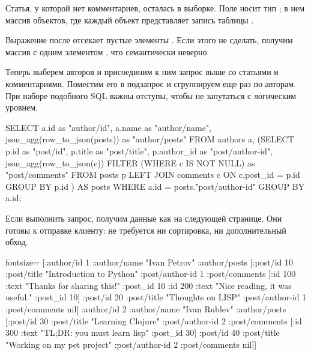 Статья, у которой нет комментариев, осталась в выборке. Поле  носит тип ; в нем массив объектов, где каждый объект представляет запись таблицы .

Выражение  после  отсекает пустые элементы . Если этого не сделать, получим массив с одним элементом , что семантически неверно.

Теперь выберем авторов и присоединим к ним запрос выше со статьями и комментариями. Поместим его в подзапрос и сгруппируем еще раз по авторам. При наборе подобного SQL важны отступы, чтобы не запутаться с логическим уровнем.

\begin{english}
  \begin{sql}
SELECT
  a.id                         as "author/id",
  a.name                       as "author/name",
  json_agg(row_to_json(posts)) as "author/posts"
FROM
  authors a,
  (SELECT
    p.id        as "post/id",
    p.title     as "post/title",
    p.author_id as "post/author-id",
    json_agg(row_to_json(c)) FILTER
            (WHERE c IS NOT NULL) as "post/comments"
  FROM posts p
  LEFT JOIN comments c ON c.post_id = p.id
  GROUP BY p.id
) AS posts
WHERE a.id = posts."post/author-id"
GROUP BY a.id;
  \end{sql}
\end{english}

Если выполнить запрос, получим данные как на следующей странице. Они готовы к отправке клиенту: не требуется ни сортировка, ни дополнительный обход.

\begin{english}
  \begin{clojure*}{fontsize=\small}
[{:author/id 1
  :author/name "Ivan Petrov"
  :author/posts
    [{:post/id 10
      :post/title "Introduction to Python"
      :post/author-id 1
      :post/comments
        [{:id 100
          :text "Thanks for sharing this!"
          :post_id 10}
         {:id 200
          :text "Nice reading, it was useful."
          :post_id 10}]}
     {:post/id 20
      :post/title "Thoughts on LISP"
      :post/author-id 1
      :post/comments nil}]}
 {:author/id 2
  :author/name "Ivan Rublev"
  :author/posts
    [{:post/id 30
      :post/title "Learning Clojure"
      :post/author-id 2
      :post/comments
        [{:id 300
          :text "TL;DR: you must learn lisp"
          :post_id 30}]}
     {:post/id 40
      :post/title "Working on my pet project"
      :post/author-id 2
      :post/comments nil}]}]
  \end{clojure*}
\end{english}

